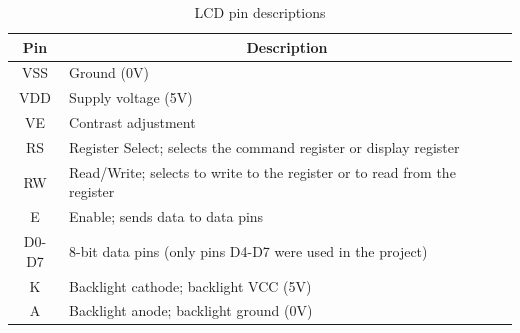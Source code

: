 \begin{table}[h!]
	\centering
	\begin{tabular}{|c|l|} 
		\hline 
		\textbf{Pin} & \multicolumn{1}{|c|}{\textbf{Description}} \\
		\hline
		VSS & Ground (0V) \\ 
		\hline 
		VDD & Supply voltage (5V) \\ 
		\hline 
		VE & Contrast adjustment \\ 
		\hline 
		RS & Register Select; selects the command register or display register \\ 
		\hline 
		RW & Read/Write; selects to write to the register or to read from the register \\ 
		\hline 
		E & Enable; sends data to data pins \\ 
		\hline 
		D0-D7 & 8-bit data pins (only pins D4-D7 were used in the project) \\ 
		\hline 
		K & Backlight cathode; backlight VCC (5V) \\ 
		\hline 
		A & Backlight anode; backlight ground (0V) \\ 
		\hline 
	\end{tabular}
	\caption{LCD pin descriptions}
	\label{table:lcdpins}
\end{table}